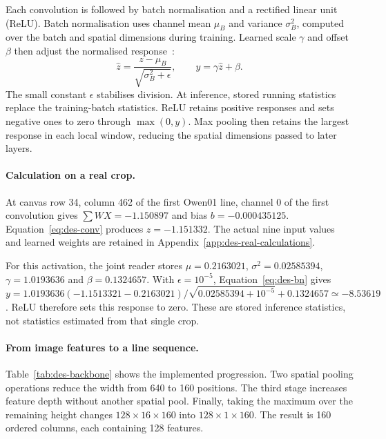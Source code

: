 Each convolution is followed by batch normalisation and a rectified linear unit (ReLU). Batch normalisation uses channel mean $\mu_B$ and variance $\sigma_B^2$, computed over the batch and spatial dimensions during training. Learned scale $\gamma$ and offset $\beta$ then adjust the normalised response~\cite[pp.~4--5]{ioffe2015}:
\begin{equation}
\widehat z=\frac{z-\mu_B}{\sqrt{\sigma_B^2+\epsilon}},\qquad
y=\gamma\widehat z+\beta.
\label{eq:des-bn}
\end{equation}
The small constant $\epsilon$ stabilises division. At inference, stored running statistics replace the training-batch statistics. ReLU retains positive responses and sets negative ones to zero through $\max(0,y)$. Max pooling then retains the largest response in each local window, reducing the spatial dimensions passed to later layers.

\paragraph{Calculation on a real crop.}
At canvas row 34, column 462 of the first Owen01 line, channel 0 of the first convolution gives $\sum WX=-1.150897$ and bias $b=-0.000435125$. Equation~\ref{eq:des-conv} produces $z=-1.151332$. The actual nine input values and learned weights are retained in Appendix~\ref{app:des-real-calculations}.

For this activation, the joint reader stores $\mu=0.2163021$, $\sigma^2=0.02585394$, $\gamma=1.0193636$ and $\beta=0.1324657$. With $\epsilon=10^{-5}$, Equation~\ref{eq:des-bn} gives
$y=1.0193636(-1.1513321-0.2163021)/\sqrt{0.02585394+10^{-5}}+0.1324657\simeq-8.53619$.
ReLU therefore sets this response to zero. These are stored inference statistics, not statistics estimated from that single crop.

\paragraph{From image features to a line sequence.}
Table~\ref{tab:des-backbone} shows the implemented progression. Two spatial pooling operations reduce the width from 640 to 160 positions. The third stage increases feature depth without another spatial pool. Finally, taking the maximum over the remaining height changes $128\times16\times160$ into $128\times1\times160$. The result is 160 ordered columns, each containing 128 features.

